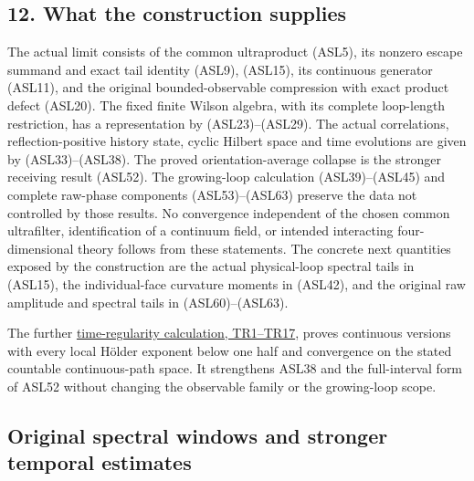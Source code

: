 \documentclass[11pt]{article}
\begin{document}
\subsection*{12. What the construction supplies}

The actual limit consists of the common ultraproduct (ASL5), its nonzero escape summand and exact tail identity (ASL9), (ASL15), its continuous generator (ASL11), and the original bounded-observable compression with exact product defect (ASL20). The fixed finite Wilson algebra, with its complete loop-length restriction, has a representation by (ASL23)–(ASL29). The actual correlations, reflection-positive history state, cyclic Hilbert space and time evolutions are given by (ASL33)–(ASL38). The proved orientation-average collapse is the stronger receiving result (ASL52). The growing-loop calculation (ASL39)–(ASL45) and complete raw-phase components (ASL53)–(ASL63) preserve the data not controlled by those results. No convergence independent of the chosen common ultrafilter, identification of a continuum field, or intended interacting four-dimensional theory follows from these statements. The concrete next quantities exposed by the construction are the actual physical-loop spectral tails in (ASL15), the individual-face curvature moments in (ASL42), and the original raw amplitude and spectral tails in (ASL60)–(ASL63).


The further \href{https://github.com/KokunoYumeto/yang-mills-interacting-workbench/blob/main/yang-mills/continuations/20261011-central-signs-shrinking-window/WILSON_TIME_REGULARITY.md}{time-regularity calculation, TR1–TR17}, proves continuous versions with every local Hölder exponent below one half and convergence on the stated countable continuous-path space. It strengthens ASL38 and the full-interval form of ASL52 without changing the observable family or the growing-loop scope.

\subsection*{Original spectral windows and stronger temporal estimates}
\end{document}
